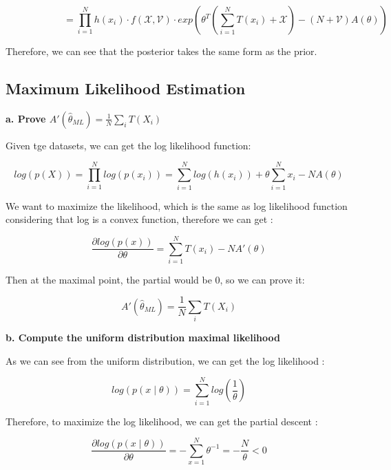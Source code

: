 \documentclass{article} %
\begin{document}
\begin{equation}
\qquad \qquad \qquad = \prod_{i=1}^N h(x_i) \cdot f(\mathcal{X, V}) \cdot
exp(\theta^T (\sum_{i=1}^N T(x_i) + \mathcal{X}) - (N + \mathcal{V}) A(\theta))
\end{equation}

Therefore, we can see that the posterior takes the same form as the prior.


\subsection{Maximum Likelihood Estimation}
\textbf{a. Prove $A'(\hat\theta_{ML}) = \frac{1}{N}\sum\limits_i T(X_i)$}

Given tge datasets, we can get the log likelihood function:

\begin{equation}
log(p(X)) = \prod_{i=1}^N log(p(x_i))
= \sum_{i=1}^N log(h(x_i)) + \theta \sum_{i=1}^N x_i - N A(\theta)
\end{equation}

We want to maximize the likelihood, which is the same as log likelihood
function considering that log is a convex function, therefore we can get :

\begin{equation}
\frac{\partial log(p(x))}{\partial \theta} = \sum_{i=1}^N T(x_i) - N A'(\theta)
\end{equation}

Then at the maximal point, the partial would be 0, so we can prove it:

\begin{equation}
A'(\hat\theta_{ML}) = \frac{1}{N}\sum\limits_i T(X_i)
\end{equation}


\textbf{b. Compute the uniform distribution maximal likelihood}

As we can see from the uniform distribution, we can get the log likelihood :

\begin{equation}
log(p(x \mid \theta)) = \sum_{i=1}^{N} log(\frac{1}{\theta})
\end{equation}

Therefore, to maximize the log likelihood, we can get the partial descent :

\begin{equation}
\frac{\partial log(p(x \mid \theta))}{\partial \theta}
= - \sum_{x=1}^{N} \theta^{-1} = - \frac{N}{\theta} < 0
\end{equation}
\end{document}
